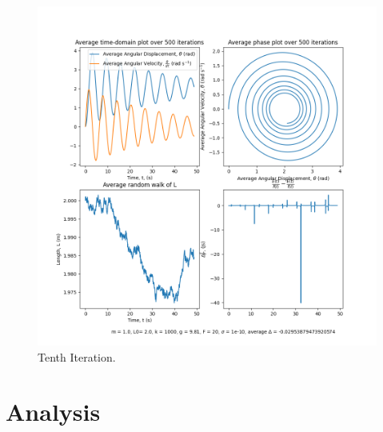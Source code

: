 \documentclass[10pt, twocolumn]{article}
\begin{document}
\begin{figure}
    \centering
    \includegraphics[width = \columnwidth]{Projects/ForcedSimplePendulum/Plots/m = 1.0, L0= 2.0, k = 1000, g = 9.81, F = 20, sigma = 1e-10, run number 9.png}
    \caption{Tenth Iteration.}
    \label{fig:enter-label}
\end{figure}



\section{Analysis}{\label{analysis}}
\end{document}
